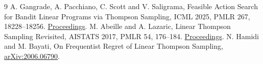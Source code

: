 \documentclass[11pt]{amsart}
\begin{document}
\begin{thebibliography}{9}
 A. Gangrade, A. Pacchiano, C. Scott and V. Saligrama, Feasible Action Search for Bandit Linear Programs via Thompson Sampling, ICML 2025, PMLR 267, 18228--18256. \href{https://proceedings.mlr.press/v267/gangrade25a.html}{Proceedings}.
 M. Abeille and A. Lazaric, Linear Thompson Sampling Revisited, AISTATS 2017, PMLR 54, 176--184. \href{https://proceedings.mlr.press/v54/abeille17a.html}{Proceedings}.
 N. Hamidi and M. Bayati, On Frequentist Regret of Linear Thompson Sampling, \href{https://arxiv.org/abs/2006.06790}{arXiv:2006.06790}.
\end{thebibliography}
\end{document}
